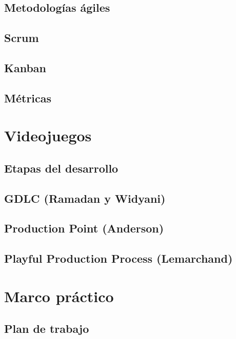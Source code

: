 \documentclass[12pt]{report}
\begin{document}
\section{Metodologías ágiles}


\section{Scrum}


\section{Kanban}


\section{Métricas}

% 
%
\chapter{Videojuegos}


\section{Etapas del desarrollo}


\section{GDLC (Ramadan y Widyani)}


\section{Production Point (Anderson)}


\section{Playful Production Process (Lemarchand)}

% 
%
\chapter{Marco práctico}
\section{Plan de trabajo}

% 
%
\printbibliography
\end{document}
